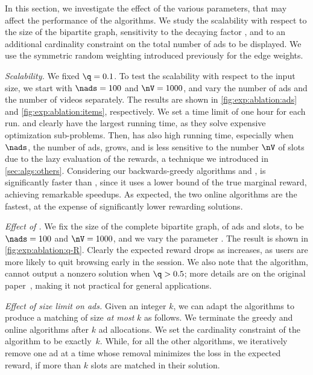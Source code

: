 In this section, we investigate the effect of the various parameters, 
that may affect the performance of the algorithms.
We study 
the scalability with respect to the size of the bipartite graph, sensitivity to the decaying factor \q, and
to an additional cardinality constraint on the total number of ads to be displayed. %
We use the symmetric random weighting introduced previously for the edge weights.

\smallskip
\noindent
\emph{Scalability.}
We fixed $\q = 0.1$.
To test the scalability with respect to the input size, 
we start with
$\nads=100$ and
$\nV=1000$, and
vary the number of ads \nads and the number of videos \nV separately. %
The results are shown in \cref{fig:exp:ablation:ads} and \cref{fig:exp:ablation:items}, respectively.
We set a time limit of one hour for each run.
\algflow and \algmwm clearly 
have the largest running time, %
as they solve expensive optimization sub-problems.
Then, %
\alggglobal has also high running time, especially when $\nads$, the number of ads, grows, 
and is less sensitive to the number $\nV$ of slots due to the lazy evaluation of the rewards,
a technique 
we introduced in \cref{sec:algs:others}.
Considering our backwards-greedy algorithms \alggbackproxy and \alggback,
\alggbackproxy is significantly faster than \alggback,
since it uses a lower bound %
of the true marginal reward, achieving remarkable speedups. %
As expected, the two online algorithms are the fastest, at the expense of significantly lower rewarding solutions.

\smallskip
\noindent
\emph{Effect of \q.}
We fix the size of the complete bipartite graph, of ads and slots, to be
$\nads=100$ and 
$\nV=1000$, 
and we vary the parameter \q.
The result is shown in \cref{fig:exp:ablation:q-R}.
Clearly the expected reward drops as \q increases, as users are more likely to quit browsing early in the session.
We also note that the \algflow algorithm, cannot output a nonzero solution when $\q>0.5$; more details are on the original paper~\citep{ieong2014advertising}, making it not practical for general applications.


\smallskip
\noindent
\emph{Effect of size limit on ads.}
Given an integer $k$, we can adapt the algorithms to produce a matching of size \emph{at most} $k$ as follows.
We terminate the greedy \alggglobal and online algorithms after $k$  ad allocations.
We set the cardinality constraint of the \algflow algorithm to be exactly~$k$.
While, for all the other algorithms, we iteratively remove one ad at a time whose removal minimizes the loss in the expected reward, if more than $k$ slots are matched in their solution.

